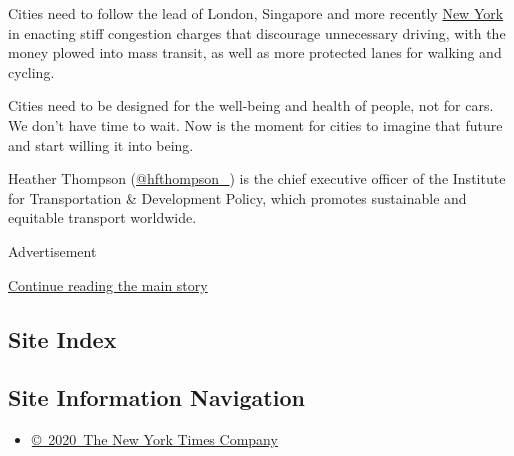 Cities need to follow the lead of London, Singapore and more recently
\href{https://www.nytimes3xbfgragh.onion/2019/04/24/nyregion/what-is-congestion-pricing.html}{New
York} in enacting stiff congestion charges that discourage unnecessary
driving, with the money plowed into mass transit, as well as more
protected lanes for walking and cycling.

Cities need to be designed for the well-being and health of people, not
for cars. We don't have time to wait. Now is the moment for cities to
imagine that future and start willing it into being.

Heather Thompson (\href{https://twitter.com/hfthompson_}{@hfthompson\_})
is the chief executive officer of the Institute for Transportation \&
Development Policy, which promotes sustainable and equitable transport
worldwide.

Advertisement

\protect\hyperlink{after-bottom}{Continue reading the main story}

\hypertarget{site-index}{%
\subsection{Site Index}\label{site-index}}

\hypertarget{site-information-navigation}{%
\subsection{Site Information
Navigation}\label{site-information-navigation}}

\begin{itemize}
\tightlist
\item
  \href{https://help.nytimes3xbfgragh.onion/hc/en-us/articles/115014792127-Copyright-notice}{©~2020~The
  New York Times Company}
\end{itemize}

